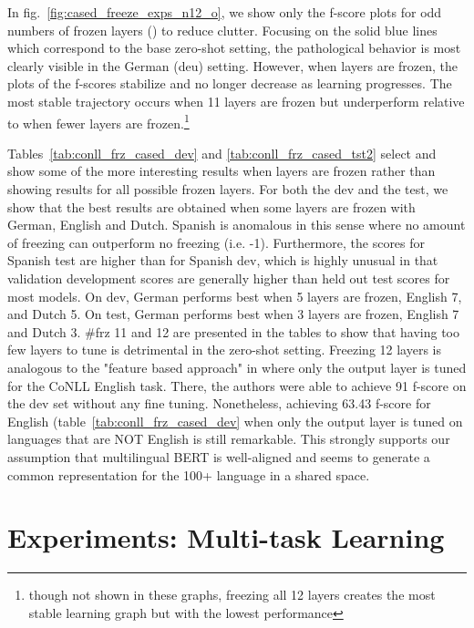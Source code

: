 \documentclass[letterpaper]{article} \usepackage{aaai20}  \usepackage{times}  \usepackage{helvet} \usepackage{courier}  \usepackage[hyphens]{url}  \usepackage{graphicx} \urlstyle{rm} \def\UrlFont{\rm}  \usepackage{graphicx}  \frenchspacing  \setlength{\pdfpagewidth}{8.5in}  \setlength{\pdfpageheight}{11in}  \usepackage{amsmath}
\begin{document}
In fig.~\ref{fig:cased_freeze_exps_n12_o}, we show only the f-score plots for odd numbers of frozen layers () to reduce clutter. Focusing on the solid blue lines which correspond to the base zero-shot setting, the pathological behavior is most clearly visible in the German (deu) setting. However, when  layers are frozen, the plots of the f-scores stabilize and no longer decrease as learning progresses. The most stable trajectory occurs when 11 layers are frozen but underperform relative to when fewer layers are frozen.\footnote{though not shown in these graphs, freezing all 12 layers creates the most stable learning graph but with the lowest performance}

Tables~\ref{tab:conll_frz_cased_dev} and \ref{tab:conll_frz_cased_tst2} select and show some of the more interesting results when layers are frozen rather than showing results for all possible  frozen layers. For both the dev and the test, we show that the best results are obtained when some layers are frozen with German, English and Dutch. Spanish is anomalous in this sense where no amount of freezing can outperform no freezing (i.e. -1). Furthermore, the scores for Spanish test are higher than for Spanish dev, which is highly unusual in that validation development scores are generally higher than held out test scores for most models. On dev, German performs best when 5 layers are frozen, English 7, and Dutch 5. On test, German performs best when 3 layers are frozen, English 7 and Dutch 3. \#frz 11 and 12 are presented in the tables to show that having too few layers to tune is detrimental in the zero-shot setting. Freezing 12 layers is analogous to the "feature based approach" in \cite{BERT18} where only the output layer is tuned for the CoNLL English task. There, the authors were able to achieve 91 f-score on the dev set without any fine tuning. Nonetheless, achieving 63.43 f-score for English (table~\ref{tab:conll_frz_cased_dev} when only the output layer is tuned on languages that are NOT English is still remarkable. This strongly supports our assumption that multilingual BERT is well-aligned and seems to generate a common representation for the 100+ language in a shared space.





 \section{Experiments: Multi-task Learning}
\label{sec:exp:mult}
\end{document}
